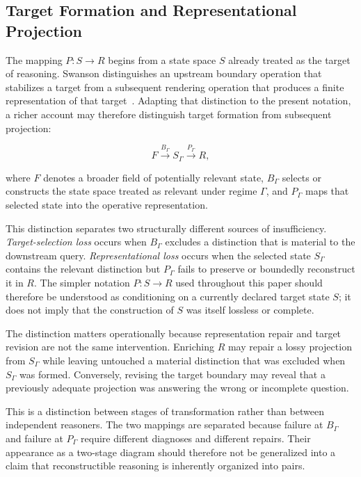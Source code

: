 \documentclass[11pt]{article}
\theoremstyle{definition}
\theoremstyle{remark}
\begin{document}
\subsection{Target Formation and Representational Projection}

The mapping \(P:S\rightarrow R\) begins from a state space \(S\) already treated as the target of reasoning. Swanson distinguishes an upstream boundary operation that stabilizes a target from a subsequent rendering operation that produces a finite representation of that target~\cite{Swanson2026Monist}. Adapting that distinction to the present notation, a richer account may therefore distinguish target formation from subsequent projection:

\[
F \xrightarrow{B_{\Gamma}} S_{\Gamma}
  \xrightarrow{P_{\Gamma}} R,
\]

where \(F\) denotes a broader field of potentially relevant state, \(B_{\Gamma}\) selects or constructs the state space treated as relevant under regime \(\Gamma\), and \(P_{\Gamma}\) maps that selected state into the operative representation.

This distinction separates two structurally different sources of insufficiency. \emph{Target-selection loss} occurs when \(B_{\Gamma}\) excludes a distinction that is material to the downstream query. \emph{Representational loss} occurs when the selected state \(S_{\Gamma}\) contains the relevant distinction but \(P_{\Gamma}\) fails to preserve or boundedly reconstruct it in \(R\). The simpler notation \(P:S\rightarrow R\) used throughout this paper should therefore be understood as conditioning on a currently declared target state \(S\); it does not imply that the construction of \(S\) was itself lossless or complete.

The distinction matters operationally because representation repair and target revision are not the same intervention. Enriching \(R\) may repair a lossy projection from \(S_{\Gamma}\) while leaving untouched a material distinction that was excluded when \(S_{\Gamma}\) was formed. Conversely, revising the target boundary may reveal that a previously adequate projection was answering the wrong or incomplete question.

This is a distinction between stages of transformation rather than between independent reasoners. The two mappings are separated because failure at \(B_\Gamma\) and failure at \(P_\Gamma\) require different diagnoses and different repairs. Their appearance as a two-stage diagram should therefore not be generalized into a claim that reconstructible reasoning is inherently organized into pairs.
\end{document}
